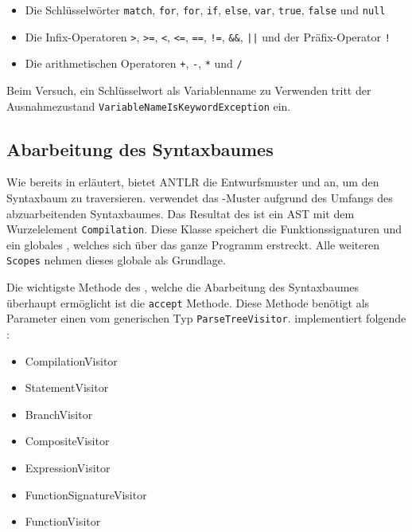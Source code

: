 \begin{itemize}
    \item Die Schlüsselwörter \texttt{match}, \texttt{for}, \texttt{for}, \texttt{if}, \texttt{else}, \texttt{var}, \texttt{true}, \texttt{false} und \texttt{null}
    \item Die Infix-Operatoren \texttt{>}, \texttt{>=}, \texttt{<}, \texttt{<=}, \texttt{==}, \texttt{!=}, \texttt{\&\&}, \texttt{||} und der Präfix-Operator \texttt{!}
    \item Die arithmetischen Operatoren \texttt{+}, \texttt{-}, \texttt{*} und \texttt{/}
\end{itemize}

Beim Versuch, ein Schlüsselwort als Variablenname zu Verwenden tritt der Ausnahmezustand \texttt{VariableNameIsKeywordException} ein. 

\subsection{Abarbeitung des Syntaxbaumes}

Wie bereits in  erläutert, bietet ANTLR die Entwurfsmuster \visitor und \listener an, um den Syntaxbaum zu traversieren. \Toya verwendet das \visitor-Muster aufgrund des Umfangs des abzuarbeitenden Syntaxbaumes. Das Resultat des \visitors ist ein AST mit dem Wurzelelement \texttt{Compilation}. Diese Klasse speichert die Funktionssignaturen und ein globales \scope, welches sich über das ganze Programm erstreckt. Alle weiteren \texttt{Scopes} nehmen dieses globale \scope als Grundlage. 

Die wichtigste Methode des \visitors, welche die Abarbeitung des Syntaxbaumes überhaupt ermöglicht ist die \texttt{accept} Methode. Diese Methode benötigt als Parameter einen \visitor vom generischen Typ \texttt{ParseTreeVisitor}. \Toya implementiert folgende \visitors:

\begin{itemize}
    \item CompilationVisitor
    \item StatementVisitor
    \item BranchVisitor
    \item CompositeVisitor
    \item ExpressionVisitor
    \item FunctionSignatureVisitor
    \item FunctionVisitor
\end{itemize}

